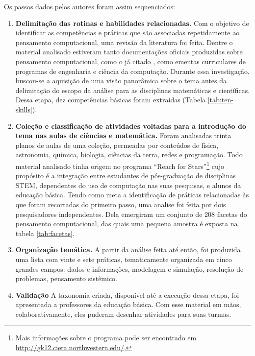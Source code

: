 Os passos dados pelos autores foram assim sequenciados:

\begin{enumerate}
  \item \textbf{Delimitação das rotinas e habilidades relacionadas.} Com o objetivo de identificar as competências e práticas que são associadas repetidamente ao pensamento computacional, uma revisão da literatura foi feita. Dentre o material analisado estiveram tanto documentações oficiais produzidas sobre pensamento computacional, como o já citado , como ementas curriculares de programas de engenharia e ciência da computação. Durante essa investigação, buscou-se a aquisição de uma visão panorâmica sobre o tema antes da delimitação do escopo da análise para as disciplinas matemáticas e científicas. Dessa etapa, dez competências básicas foram extraídas (Tabela \ref{tab:ten-skills}).

  

  \item \textbf{Coleção e classificação de atividades voltadas para a introdução do tema nas aulas de ciências e matemática.} Foram analisadas trinta planos de aulas de uma coleção, permeadas por conteúdos de física, astronomia, química, biologia, ciências da terra, redes e programação. Todo material analisado tinha origem no programa ``Reach for Stars''\footnote{Mais informações sobre o programa pode ser encontrado em \href{http://gk12.ciera.northwestern.edu/}{http://gk12.ciera.northwestern.edu/}, } cujo propósito é a integração entre estudantes de pós-graduação de disciplinas STEM, dependentes do uso de computação nas suas pesquisas, e alunos da educação básica. Tendo como meta a identificação de práticas relacionadas às que foram recortadas do primeiro passo, uma analise foi feita por dois pesquisadores independentes. Dela emergiram um conjunto de 208 facetas do pensamento computacional, das quais uma pequena amostra é exposta na tabela \ref{tab:facetas}.
  
  

  \item \textbf{Organização temática.} A partir da análise feita até então, foi produzida uma lista com vinte e sete práticas, tematicamente organizada em cinco grandes campos: dados e informações, modelagem e simulação, resolução de problemas, pensamento sistêmico.

  \item \textbf{Validação} A taxonomia criada, disponível até a execução dessa etapa, foi apresentada a professores da educação básica. Com esse material em mãos, colaborativamente, eles puderam desenhar atividades para suas turmas. 


\end{enumerate}
